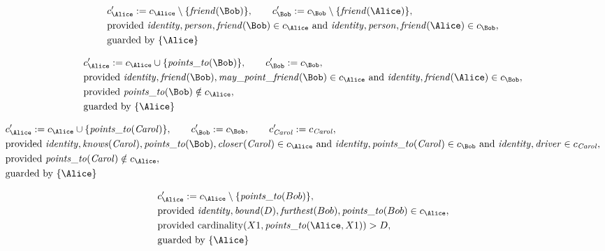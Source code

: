 \begin{align*}
&
c'_
{
\Alice
}
 := 
c_
{
\Alice
}
 \setminus 
\{
\mathit{\detokenize{
friend
}}
(
\Bob
)
\}
, \qquad 
c'_
{
\Bob
}
 := 
c_
{
\Bob
}
 \setminus 
\{
\mathit{\detokenize{
friend
}}
(
\Alice
)
\}
,\\
&
\text{provided } 
\mathit{\detokenize{
identity
}}
,
\mathit{\detokenize{
person
}}
,
\mathit{\detokenize{
friend
}}
(
\Bob
)
 \in c_
{
\Alice
}
 \text{ and } 
\mathit{\detokenize{
identity
}}
,
\mathit{\detokenize{
person
}}
,
\mathit{\detokenize{
friend
}}
(
\Alice
)
 \in c_
{
\Bob
}
,\\
&
\text{guarded by } \{
\Alice
\}
\end{align*}

\begin{align*}
&
c'_
{
\Alice
}
 := 
c_
{
\Alice
}
 \cup 
\{
\mathit{\detokenize{
points_to
}}
(
\Bob
)
\}
, \qquad 
c'_
{
\Bob
}
 := 
c_
{
\Bob
}
,\\
&
\text{provided } 
\mathit{\detokenize{
identity
}}
,
\mathit{\detokenize{
friend
}}
(
\Bob
)
,
\mathit{\detokenize{
may_point_friend
}}
(
\Bob
)
 \in c_
{
\Alice
}
 \text{ and } 
\mathit{\detokenize{
identity
}}
,
\mathit{\detokenize{
friend
}}
(
\Alice
)
 \in c_
{
\Bob
}
,\\
&
\text{provided } 
\mathit{\detokenize{
points_to
}}
(
\Bob
)
 \notin c_
{
\Alice
}
,\\
&
\text{guarded by } \{
\Alice
\}
\end{align*}

\begin{align*}
&
c'_
{
\Alice
}
 := 
c_
{
\Alice
}
 \cup 
\{
\mathit{\detokenize{
points_to
}}
(
\mathit{Carol}
)
\}
, \qquad 
c'_
{
\Bob
}
 := 
c_
{
\Bob
}
, \qquad 
c'_
{
\mathit{Carol}
}
 := 
c_
{
\mathit{Carol}
}
,\\
&
\text{provided } 
\mathit{\detokenize{
identity
}}
,
\mathit{\detokenize{
knows
}}
(
\mathit{Carol}
)
,
\mathit{\detokenize{
points_to
}}
(
\Bob
)
,
\mathit{\detokenize{
closer
}}
(
\mathit{Carol}
)
 \in c_
{
\Alice
}
 \text{ and } 
\mathit{\detokenize{
identity
}}
,
\mathit{\detokenize{
points_to
}}
(
\mathit{Carol}
)
 \in c_
{
\Bob
}
 \text{ and } 
\mathit{\detokenize{
identity
}}
,
\mathit{\detokenize{
driver
}}
 \in c_
{
\mathit{Carol}
}
,\\
&
\text{provided } 
\mathit{\detokenize{
points_to
}}
(
\mathit{Carol}
)
 \notin c_
{
\Alice
}
,\\
&
\text{guarded by } \{
\Alice
\}
\end{align*}

\begin{align*}
&
c'_
{
\Alice
}
 := 
c_
{
\Alice
}
 \setminus 
\{
\mathit{\detokenize{
points_to
}}
(
Bob
)
\}
,\\
&
\text{provided } 
\mathit{\detokenize{
identity
}}
,
\mathit{\detokenize{
bound
}}
(
D
)
,
\mathit{\detokenize{
furthest
}}
(
Bob
)
,
\mathit{\detokenize{
points_to
}}
(
Bob
)
 \in c_
{
\Alice
}
,\\
&
\text{provided } 
\mathrm{cardinality}(
X1
,
\mathit{\detokenize{
points_to
}}
(
\Alice
,
X1
)
)
>
D
,\\
&
\text{guarded by } \{
\Alice
\}
\end{align*}
